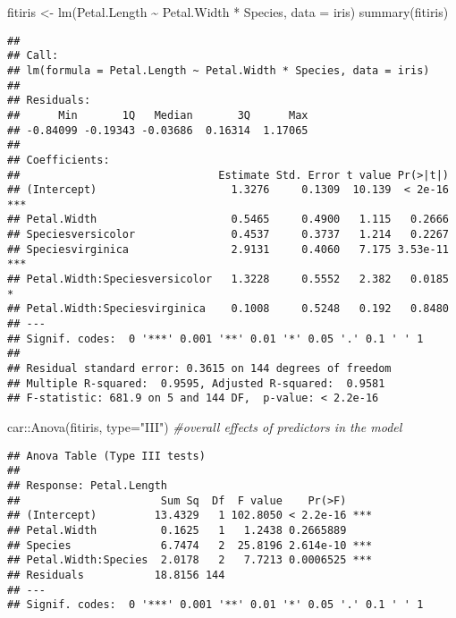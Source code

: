 \documentclass[
]{book}
\newenvironment{Shaded}{\begin{snugshade}}{\end{snugshade}}
\newcommand{\AttributeTok}[1]{\textcolor[rgb]{0.77,0.63,0.00}{#1}}
\newcommand{\CommentTok}[1]{\textcolor[rgb]{0.56,0.35,0.01}{\textit{#1}}}
\newcommand{\FunctionTok}[1]{\textcolor[rgb]{0.00,0.00,0.00}{#1}}
\newcommand{\NormalTok}[1]{#1}
\newcommand{\OtherTok}[1]{\textcolor[rgb]{0.56,0.35,0.01}{#1}}
\newcommand{\SpecialCharTok}[1]{\textcolor[rgb]{0.00,0.00,0.00}{#1}}
\newcommand{\StringTok}[1]{\textcolor[rgb]{0.31,0.60,0.02}{#1}}
\begin{document}
\begin{Shaded}
\begin{Highlighting}[]
\NormalTok{fitiris }\OtherTok{\textless{}{-}} \FunctionTok{lm}\NormalTok{(Petal.Length }\SpecialCharTok{\textasciitilde{}}\NormalTok{ Petal.Width }\SpecialCharTok{*}\NormalTok{ Species, }\AttributeTok{data =}\NormalTok{ iris)}
\FunctionTok{summary}\NormalTok{(fitiris)}
\end{Highlighting}
\end{Shaded}

\begin{verbatim}
## 
## Call:
## lm(formula = Petal.Length ~ Petal.Width * Species, data = iris)
## 
## Residuals:
##      Min       1Q   Median       3Q      Max 
## -0.84099 -0.19343 -0.03686  0.16314  1.17065 
## 
## Coefficients:
##                               Estimate Std. Error t value Pr(>|t|)    
## (Intercept)                     1.3276     0.1309  10.139  < 2e-16 ***
## Petal.Width                     0.5465     0.4900   1.115   0.2666    
## Speciesversicolor               0.4537     0.3737   1.214   0.2267    
## Speciesvirginica                2.9131     0.4060   7.175 3.53e-11 ***
## Petal.Width:Speciesversicolor   1.3228     0.5552   2.382   0.0185 *  
## Petal.Width:Speciesvirginica    0.1008     0.5248   0.192   0.8480    
## ---
## Signif. codes:  0 '***' 0.001 '**' 0.01 '*' 0.05 '.' 0.1 ' ' 1
## 
## Residual standard error: 0.3615 on 144 degrees of freedom
## Multiple R-squared:  0.9595, Adjusted R-squared:  0.9581 
## F-statistic: 681.9 on 5 and 144 DF,  p-value: < 2.2e-16
\end{verbatim}

\begin{Shaded}
\begin{Highlighting}[]
\NormalTok{car}\SpecialCharTok{::}\FunctionTok{Anova}\NormalTok{(fitiris, }\AttributeTok{type=}\StringTok{"III"}\NormalTok{) }\CommentTok{\#overall effects of predictors in the model}
\end{Highlighting}
\end{Shaded}

\begin{verbatim}
## Anova Table (Type III tests)
## 
## Response: Petal.Length
##                      Sum Sq  Df  F value    Pr(>F)    
## (Intercept)         13.4329   1 102.8050 < 2.2e-16 ***
## Petal.Width          0.1625   1   1.2438 0.2665889    
## Species              6.7474   2  25.8196 2.614e-10 ***
## Petal.Width:Species  2.0178   2   7.7213 0.0006525 ***
## Residuals           18.8156 144                       
## ---
## Signif. codes:  0 '***' 0.001 '**' 0.01 '*' 0.05 '.' 0.1 ' ' 1
\end{verbatim}
\end{document}
